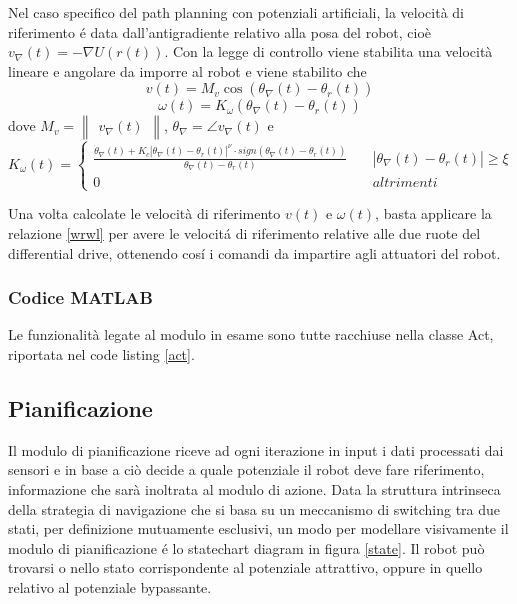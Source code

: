 \documentclass[14pt,a4paper]{extarticle}
\begin{document}
Nel caso specifico del path planning con potenziali artificiali, la velocità di riferimento é data dall'antigradiente relativo alla posa del robot, cioè \(v_\nabla(t) = -\nabla U(r(t))\). Con la legge di controllo viene stabilita una velocità lineare e angolare da imporre al robot e viene stabilito che
\begin{equation}
v(t) = M_v \cos(\theta_{\nabla}(t) - \theta_r(t))
\end{equation} 
\begin{equation}
\omega(t) = K_{\omega}(\theta_{\nabla}(t) - \theta_r(t))
\end{equation} dove \(M_v=\begin{Vmatrix}v_{\nabla}(t)\end{Vmatrix}\), \(\theta_{\nabla}=\angle v_{\nabla}(t)\) e 
\[K_{\omega}(t)= \begin{cases}
\frac{\dot{\theta}_{\nabla}(t) + K_c|\theta_{\nabla}(t)-\theta_r(t)|^{\nu} \cdot sign(\theta_{\nabla}(t) - \theta_r(t))}{\theta_{\nabla}(t) - \theta_r(t)} \quad &|\theta_{\nabla}(t)-\theta_r(t)| \geq \xi \\
0 \quad &altrimenti
\end{cases}\]

Una volta calcolate le velocità di riferimento \(v(t)\) e \(\omega(t)\), basta applicare la relazione \ref{wrwl} per avere le velocitá di riferimento relative alle due ruote del differential drive, ottenendo cosí i comandi da impartire agli attuatori del robot.

\subsubsection{Codice MATLAB}
Le funzionalità legate al modulo in esame sono tutte racchiuse nella classe Act, riportata nel code listing \ref{act}. 

\subsection{Pianificazione}
Il modulo di pianificazione riceve ad ogni iterazione in input i dati processati dai sensori e in base a ciò decide a quale potenziale il robot deve fare riferimento, informazione che sarà inoltrata al modulo di azione. Data la struttura intrinseca della strategia di navigazione che si basa su un meccanismo di switching tra due stati, per definizione mutuamente esclusivi, un modo per modellare visivamente il modulo di pianificazione é lo statechart diagram in figura \ref{state}. Il robot può trovarsi o nello stato corrispondente al potenziale attrattivo, oppure in quello relativo al potenziale bypassante.
\end{document}

